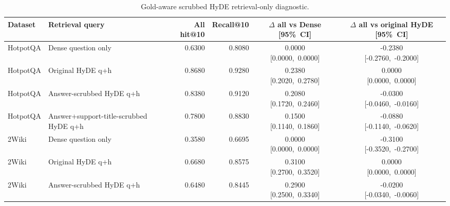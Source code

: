 \begin{table}[htbp]
\centering
\caption{Gold-aware scrubbed HyDE retrieval-only diagnostic.}
\label{tab:hyde_gold_content_scrubbed}
\footnotesize
\setlength{\tabcolsep}{3pt}
\renewcommand{\arraystretch}{1.08}
\begin{tabularx}{\textwidth}{@{}l>{\raggedright\arraybackslash}Xrrcc@{}}
\toprule
Dataset & Retrieval query & All hit@10 & Recall@10 & \shortstack{$\Delta$ all vs Dense\\\mbox{[95\% CI]}} & \shortstack{$\Delta$ all vs\\original HyDE\\\mbox{[95\% CI]}} \\
\midrule
HotpotQA & Dense question only & 0.6300 & 0.8080 & \shortstack{0.0000\\\mbox{[0.0000, 0.0000]}} & \shortstack{-0.2380\\\mbox{[-0.2760, -0.2000]}} \\
HotpotQA & Original HyDE q+h & 0.8680 & 0.9280 & \shortstack{0.2380\\\mbox{[0.2020, 0.2780]}} & \shortstack{0.0000\\\mbox{[0.0000, 0.0000]}} \\
HotpotQA & Answer-scrubbed HyDE q+h & 0.8380 & 0.9120 & \shortstack{0.2080\\\mbox{[0.1720, 0.2460]}} & \shortstack{-0.0300\\\mbox{[-0.0460, -0.0160]}} \\
HotpotQA & Answer+support-title-scrubbed HyDE q+h & 0.7800 & 0.8830 & \shortstack{0.1500\\\mbox{[0.1140, 0.1860]}} & \shortstack{-0.0880\\\mbox{[-0.1140, -0.0620]}} \\
2Wiki & Dense question only & 0.3580 & 0.6695 & \shortstack{0.0000\\\mbox{[0.0000, 0.0000]}} & \shortstack{-0.3100\\\mbox{[-0.3520, -0.2700]}} \\
2Wiki & Original HyDE q+h & 0.6680 & 0.8575 & \shortstack{0.3100\\\mbox{[0.2700, 0.3520]}} & \shortstack{0.0000\\\mbox{[0.0000, 0.0000]}} \\
2Wiki & Answer-scrubbed HyDE q+h & 0.6480 & 0.8445 & \shortstack{0.2900\\\mbox{[0.2500, 0.3340]}} & \shortstack{-0.0200\\\mbox{[-0.0340, -0.0060]}} \\

\end{tabularx}
\end{table}
